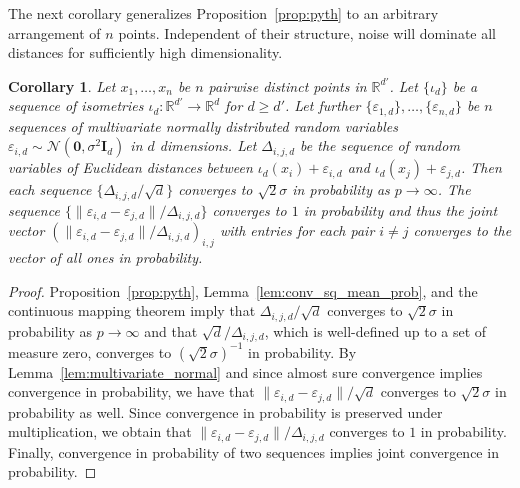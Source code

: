 \documentclass{article}
\theoremstyle{plain}
\newtheorem{corollary}[theorem]{Corollary}
\theoremstyle{definition}
\theoremstyle{remark}
\begin{document}
The next corollary generalizes Proposition~\ref{prop:pyth} to an arbitrary arrangement of $n$ points. Independent of their structure, noise will dominate all distances for sufficiently high dimensionality.
\begin{corollary}\label{cor:noise_dominates_n_pts}
    Let $x_1, \dots, x_n$ be $n$ pairwise distinct points in $\mathbb{R}^{d'}$. Let $\{\iota_d\}$ be a sequence of isometries $\iota_d: \mathbb{R}^{d'} \to \mathbb{R}^{d}$ for $d\geq d'$. Let further $\{\varepsilon_{1,d}\}, \dots, \{\varepsilon_{n, d}\}$ be $n$ sequences of multivariate normally distributed random variables $\varepsilon_{i, d} \sim \mathcal{N}(\mathbf{0}, \sigma^2\mathbf{I}_d)$ in $d$ dimensions. Let $\Delta_{i,j, d}$ be the sequence of random variables of Euclidean distances between $\iota_d(x_i) + \varepsilon_{i, d}$ and $\iota_d(x_j) + \varepsilon_{j, d}$. Then each sequence $\{\Delta_{i,j, d}/\sqrt{d}\}$ converges to $\sqrt{2}\sigma$ in probability as $p\to \infty$. The sequence $\{\|\varepsilon_{i, d} - \varepsilon_{j, d}\| / \Delta_{i,j, d}\}$ converges to $1$ in probability and thus the joint vector $(\|\varepsilon_{i, d} - \varepsilon_{j, d}\| / \Delta_{i,j, d})_{i,j}$ with entries for each pair $i\neq j$ converges to the vector of all ones in probability.
\end{corollary}
\begin{proof}
    Proposition~\ref{prop:pyth}, Lemma~\ref{lem:conv_sq_mean_prob}, and the continuous mapping theorem imply that $\Delta_{i,j, d} / \sqrt{d}$ converges to $\sqrt{2}\sigma$ in probability as $p\to \infty$ and that $\sqrt{d} / \Delta_{i,j, d}$, which is well-defined up to a set of measure zero,  converges to $(\sqrt{2}\sigma)^{-1}$ in probability. By Lemma~\ref{lem:multivariate_normal} and since almost sure convergence implies convergence in probability, we have that $\|\varepsilon_{i, d} - \varepsilon_{j, d}\| /\sqrt{d}$ converges to $\sqrt{2}\sigma$ in probability as well. Since convergence in probability is preserved under multiplication, we obtain that $\|\varepsilon_{i, d} - \varepsilon_{j, d}\| /  \Delta_{i,j, d}$ converges to $1$ in probability. Finally, convergence in probability of two sequences implies joint convergence in probability.
\end{proof}
\end{document}
